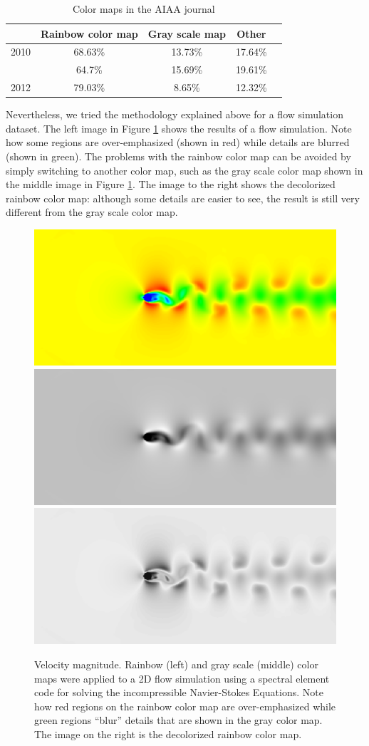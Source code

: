 %
\begin{table}[b]
\caption{Color maps in the AIAA journal} \label{table:aiaa_colormap}{}\centering
\begin{tabular}{lcccc}
				&  	Rainbow color map	 & Gray scale map & Other\\ \hline
	2010		&       68.63\%		   	 &        13.73\% & 17.64\%    		          \\
\gc	2011		& 		64.7\%		 	 &        15.69\%& 19.61\%      		     	  \\
	2012		&       79.03\% 	     &        8.65\% & 12.32\%        		      \\
\end{tabular}
\end{table}
%
Nevertheless, we tried the methodology explained above for a flow simulation dataset. 
The left image in Figure \ref{fig:flowdata} shows the results of a flow simulation. Note how some regions are over-emphasized (shown in red) while details are blurred (shown in green). The problems with the rainbow color map can be avoided by simply switching to another color map, such as the gray scale color map shown in the middle image in Figure \ref{fig:flowdata}. The image to the right shows the decolorized rainbow color map: although some details are easier to see, the result is still very different from the gray scale color map.

 \begin{figure}[b]
 	\centering
       \includegraphics[width=0.325\linewidth]{chapter6/figures/vector_field_rainbow.png}
       \includegraphics[width=0.325\linewidth]{chapter6/figures/vector_field_gray.png}
       \includegraphics[width=0.325\linewidth]{chapter6/figures/vector_field_rainbow_then_gray.png}
   \caption{Velocity magnitude. Rainbow (left) and gray scale (middle) color maps were applied to a 2D flow simulation using a spectral element code for solving the incompressible Navier-Stokes Equations. Note how red regions on the rainbow color map are over-emphasized while green regions ``blur'' details that are shown in the gray color map. The image on the right is the decolorized rainbow color map.}
   \label{fig:flowdata}
 \end{figure}

